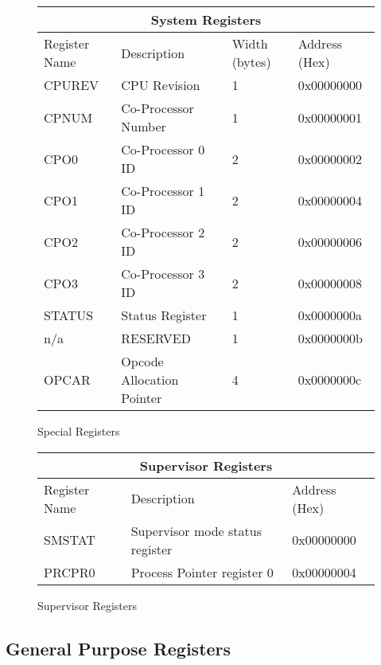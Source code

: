 \documentclass[letterpaper, 11pt]{article}
\begin{document}
\begin{figure}
	
	\caption{Special Registers}
	\begin{center}
		\fontsize{6}{8}\selectfont
		\begin{tabular}{|l|l|l|l|}
			\hline
			\multicolumn{4}{|c|}{System Registers} \\
			\hline
			Register Name & Description & Width (bytes) &Address (Hex) \\ \hline
			CPUREV  & CPU Revision 				 & 	1		& 0x00000000\\ 	\hline
			CPNUM	& Co-Processor Number		 &	1		& 0x00000001\\	\hline
			CPO0  	& Co-Processor 0 ID 		 & 	2		& 0x00000002\\ 	\hline
			CPO1  	& Co-Processor 1 ID 		 &	2		& 0x00000004\\ 	\hline
			CPO2  	& Co-Processor 2 ID 		 &	2		& 0x00000006\\ 	\hline
			CPO3  	& Co-Processor 3 ID 		 &	2		& 0x00000008\\ 	\hline
			STATUS  & Status Register			 &	1		& 0x0000000a \\ 	\hline
			n/a		& RESERVED				 	 &	1		& 0x0000000b \\ \hline
			OPCAR	& Opcode Allocation Pointer	 &	4		& 0x0000000c \\ \hline
			
		\end{tabular}
	\end{center}
\end{figure}

\begin{figure}
	\caption{Supervisor Registers}
	
	\begin{center}
		\fontsize{6}{8}\selectfont
		\begin{tabular}{|l|l|l|}
			\hline
			\multicolumn{3}{|c|}{Supervisor Registers} \\
			\hline
			Register Name & Description & Address (Hex)\\ \hline
			SMSTAT & Supervisor mode status register & 0x00000000 \\ 	\hline
			PRCPR0 & Process Pointer register 0 & 0x00000004	\\ \hline 
		\end{tabular}
	\end{center}
	
\end{figure}
\subsection{General Purpose Registers}
\end{document}
